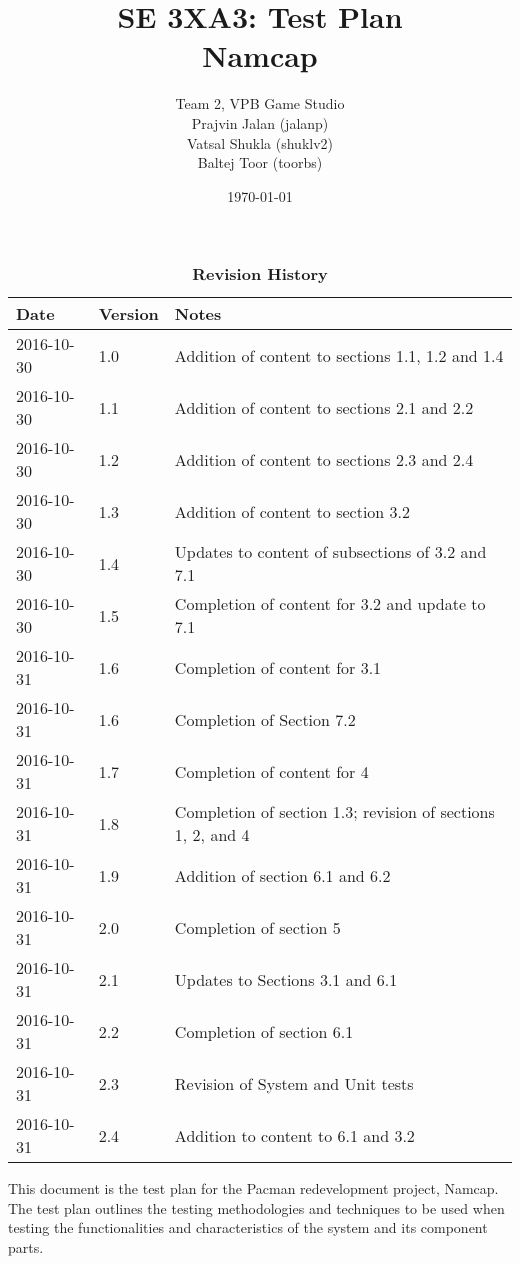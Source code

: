 \documentclass[12pt, titlepage]{article}
\title{SE 3XA3: Test Plan\\Namcap}
\author{Team 2, VPB Game Studio
		\\ Prajvin Jalan (jalanp)
		\\ Vatsal Shukla (shuklv2)
		\\ Baltej Toor (toorbs)
}
\date{\today}
\begin{document}
\maketitle

\tableofcontents
\listoftables
\listoffigures

\begin{table}
\caption{\bf Revision History}
\begin{tabularx}{\textwidth}{p{3cm}p{2cm}X}
\toprule {\bf Date} & {\bf Version} & {\bf Notes}\\
\midrule
2016-10-30 & 1.0 & Addition of content to sections 1.1, 1.2 and 1.4\\
2016-10-30 & 1.1 & Addition of content to sections 2.1 and 2.2\\
2016-10-30 & 1.2 & Addition of content to sections 2.3 and 2.4\\
2016-10-30 & 1.3 & Addition of content to section 3.2\\
2016-10-30 & 1.4 & Updates to content of subsections of 3.2 and 7.1\\
2016-10-30 & 1.5 & Completion of content for 3.2 and update to 7.1\\
2016-10-31 & 1.6 & Completion of content for 3.1\\
2016-10-31 & 1.6 & Completion of Section 7.2\\
2016-10-31 & 1.7 & Completion of content for 4\\
2016-10-31 & 1.8 & Completion of section 1.3; revision of sections 1, 2, and 4\\
2016-10-31 & 1.9 & Addition of section 6.1 and 6.2\\
2016-10-31 & 2.0 & Completion of section 5\\
2016-10-31 & 2.1 & Updates to Sections 3.1 and 6.1\\
2016-10-31 & 2.2 & Completion of section 6.1\\
2016-10-31 & 2.3 & Revision of System and Unit tests\\
2016-10-31 & 2.4 & Addition to content to 6.1 and 3.2\\
\bottomrule
\end{tabularx}
\end{table}

\newpage


This document is the test plan for the Pacman redevelopment project, Namcap. The test plan outlines the testing methodologies and techniques to be used when testing the functionalities and characteristics of the system and its component parts.
\end{document}
